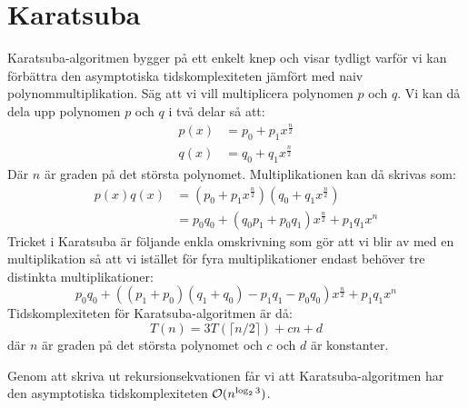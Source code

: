 \section{Karatsuba}
\label{sec:karatsuba}
Karatsuba-algoritmen bygger på ett enkelt knep och visar tydligt varför vi kan
förbättra den asymptotiska tidskomplexiteten jämfört med naiv
polynommultiplikation. Säg att vi vill multiplicera polynomen $p$ och $q$. Vi
kan då dela upp polynomen $p$ och $q$ i två delar så att:
\begin{align*}
  p(x) &= p_0 + p_1 x^{\frac{n}{2}} \\
  q(x) &= q_0 + q_1 x^{\frac{n}{2}}
\end{align*}
Där $n$ är graden på det största polynomet. Multiplikationen kan då skrivas
som:
\begin{align*}
p(x)q(x) &= (p_0 + p_1 x^{\frac{n}{2}})(q_0 + q_1 x^{\frac{n}{2}}) \\
         &= p_0 q_0  + (q_0 p_1 +p_0 q_1 )  x^{\frac{n}{2}} + p_1 q_1  x^n
\end{align*}
Tricket i Karatsuba är följande enkla omskrivning som gör att vi blir av med en
multiplikation så att vi istället för fyra multiplikationer endast behöver tre
distinkta multiplikationer:
\begin{equation*}
  p_0 q_0 + ((p_1 + p_0)(q_1 + q_0) - p_1 q_1 - p_0 q_0)  x^{\frac{n}{2}} + p_1 q_1  x^n
\end{equation*}
Tidskomplexiteten för Karatsuba-algoritmen är då:
\begin{equation*}
  T(n) = 3 T(\lceil n/2\rceil) + cn + d
\end{equation*}
där $n$ är graden på det största polynomet och $c$ och $d$ är konstanter.

Genom att skriva ut rekursionsekvationen får vi att Karatsuba-algoritmen har
den asymptotiska tidskomplexiteten $\mathcal{O}(n^{\log_2 3})$.
